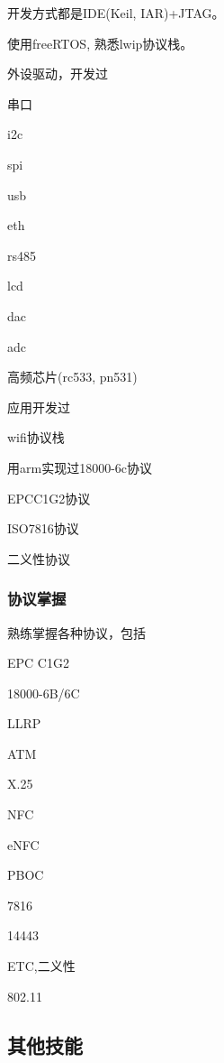\documentclass[titlepage]{article}
\begin{document}
开发方式都是IDE(Keil, IAR)+JTAG。

使用freeRTOS, 熟悉lwip协议栈。

外设驱动，开发过

\begin{compactitem}
    \item 串口
    \item i2c
    \item spi
    \item usb
    \item eth
    \item rs485
    \item lcd
    \item dac
    \item adc
    \item 高频芯片(rc533, pn531)
\end{compactitem}

应用开发过

\begin{compactitem}
    \item wifi协议栈
    \item 用arm实现过18000-6c协议
    \item EPCC1G2协议
    \item ISO7816协议
    \item 二义性协议
\end{compactitem}


\subsubsection{协议掌握}

熟练掌握各种协议，包括

\begin{compactitem}
    \item EPC C1G2
    \item 18000-6B/6C
    \item LLRP
    \item ATM
    \item X.25
    \item NFC
    \item eNFC
    \item PBOC
    \item 7816
    \item 14443
    \item ETC,二义性
    \item 802.11
\end{compactitem}


\subsection{其他技能}
\end{document}
